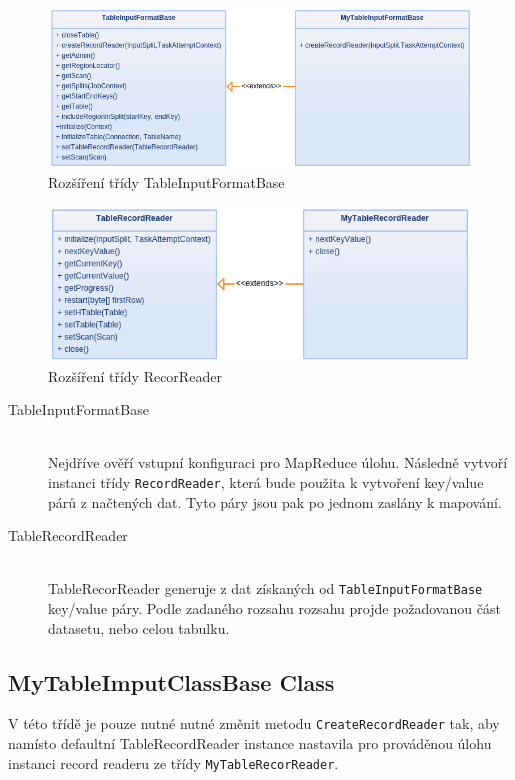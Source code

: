 \documentclass[thesis=M,czech]{FITthesis}[2012/06/26]
\begin{document}
\begin{figure}\centering
	\includegraphics[width=1\textwidth, angle=0]{files/input}
	\caption[Rozšíření třídy TableInputFormatBase]
	{Rozšíření třídy TableInputFormatBase}\label{fig:input}
\end{figure} 

\begin{figure}\centering
	\includegraphics[width=1\textwidth, angle=0]{files/record}
	\caption[Rozšíření třídy RecorReader]
	{Rozšíření třídy RecorReader}\label{fig:record}
\end{figure} 

\begin{description}
\item[TableInputFormatBase] \hfill \\
Nejdříve ověří vstupní konfiguraci pro MapReduce úlohu. Následně vytvoří instanci třídy \texttt{RecordReader}, která bude použita k vytvoření key/value párů z načtených dat. Tyto páry jsou pak po jednom zaslány k mapování.

\item[TableRecordReader] \hfill \\
TableRecorReader generuje z dat získaných od \texttt{TableInputFormatBase} key/value páry. Podle zadaného rozsahu rozsahu projde požadovanou část datasetu, nebo celou tabulku. 
\end{description}

\subsection{MyTableImputClassBase Class}
V této třídě je pouze nutné nutné změnit metodu \texttt{CreateRecordReader} tak, aby namísto defaultní TableRecordReader instance nastavila pro prováděnou úlohu instanci record readeru ze třídy \texttt{MyTableRecorReader}.
\end{document}
